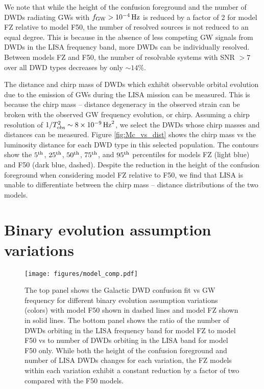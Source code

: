 \documentclass[twocolumn]{aastex631}
\begin{document}
We note that while the height of the confusion foreground and the number of DWDs radiating GWs with $f_{\rm{GW}} > 10^{-4}\,\rm{Hz}$ is reduced by a factor of 2 for model FZ relative to model F50, the number of resolved sources is not reduced to an equal degree. This is because in the absence of less competing GW signals from DWDs in the LISA frequency band, more DWDs can be individually resolved. Between models FZ and F50, the number of resolvable systems with SNR $>7$ over all DWD types decreases by only $\sim14\%$. 

The distance and chirp mass of DWDs which exhibit observable orbital evolution due to the emission of GWs during the LISA mission can be measured. This is because the chirp mass -- distance degeneracy in the observed strain can be broken with the observed GW frequency evolution, or chirp. Assuming a chirp resolution of $1/T_{\rm{obs}}^2 \sim 8\times10^{-9}\,\rm{Hz}^2$, we select the DWDs whose chirp masses and distances can be measured. Figure \ref{fig:Mc_vs_dist} shows the chirp mass vs the luminosity distance for each DWD type in this selected population. The contours show the $5^{\rm{th}}$, $25^{\rm{th}}$, $50^{\rm{th}}$, $75^{\rm{th}}$, and $95^{\rm{th}}$ percentiles for models FZ (light blue) and F50 (dark blue, dashed). Despite the reduction in the height of the confusion foreground when considering model FZ relative to F50, we find that LISA is unable to differentiate between the chirp mass -- distance distributions of the two models.

\section{Binary evolution assumption variations}
\label{sec:model_compare}

\begin{figure}
	\texttt{[image: figures/model\_comp.pdf]}
    \caption{The top panel shows the Galactic DWD confusion fit vs GW frequency for different binary evolution assumption variations (colors) with model F50 shown in dashed lines and model FZ shown in solid lines. The bottom panel shows the ratio of the number of DWDs orbiting in the LISA frequency band for model FZ to model F50 vs to number of DWDs orbiting in the LISA band for model F50 only. While both the height of the confusion foreground and number of LISA DWDs changes for each variation, the FZ models within each variation exhibit a constant reduction by a factor of two compared with the F50 models.}
    \label{fig:model_comp}
\end{figure}
\end{document}
